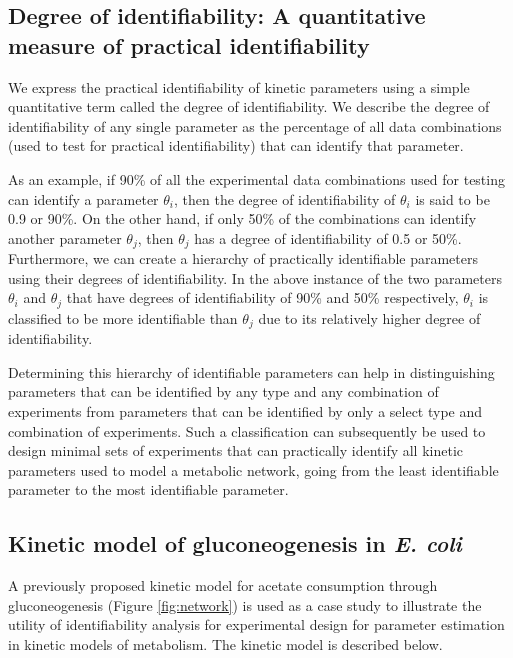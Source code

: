 \documentclass[10pt]{article}
\begin{document}
	\subsection{Degree of identifiability: A quantitative measure of practical identifiability}\label{sec:degree_of_identifiability}
	We express the practical identifiability of kinetic parameters using a simple quantitative term called the degree of identifiability. We describe the degree of identifiability of any single parameter as the percentage of all data combinations (used to test for practical identifiability) that can identify that parameter. 
	
	As an example, if 90\% of all the experimental data combinations used for testing can identify a parameter $\theta_i$, then the degree of identifiability of $\theta_i$ is said to be 0.9 or 90\%. On the other hand, if only 50\% of the combinations can identify another parameter $\theta_j$, then $\theta_j$ has a degree of identifiability of 0.5 or 50\%. Furthermore, we can create a hierarchy of practically identifiable parameters using their degrees of identifiability. In the above instance of the two parameters $\theta_i$ and $\theta_j$ that have degrees of identifiability of 90\% and 50\% respectively, $\theta_i$ is classified to be more identifiable than $\theta_j$ due to its relatively higher degree of identifiability. 
	
	Determining this hierarchy of identifiable parameters can help in distinguishing parameters that can be identified by any type and any combination of experiments from parameters that can be identified by only a select type and combination of experiments. Such a classification can subsequently be used to design minimal sets of experiments that can practically identify all kinetic parameters used to model a metabolic network, going from the least identifiable parameter to the most identifiable parameter.  
	
	\subsection{Kinetic model of gluconeogenesis in \textit{E. coli}}\label{sec:small-model}
	A previously proposed kinetic model \parencite{Kotte2014, Srinivasan2017} for acetate consumption through gluconeogenesis (Figure \ref{fig:network}) is used as a case study to illustrate the utility of identifiability analysis for experimental design for parameter estimation in kinetic models of metabolism. The kinetic model is described below.
	
\end{document}
